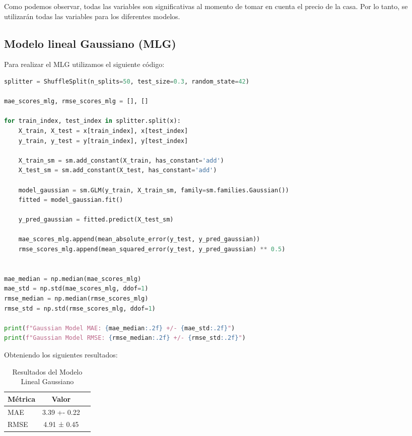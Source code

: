 \documentclass[12pt,a4paper]{article}
\begin{document}
Como podemos observar, todas las variables son significativas al momento de tomar en cuenta el precio de la casa. Por lo tanto, se utilizarán todas las variables para los diferentes modelos.

\vspace{0.5cm}

\subsection{Modelo lineal Gaussiano (MLG)}

Para realizar el MLG utilizamos el siguiente código:

\begin{lstlisting}[language=Python, frame=single, basicstyle=\ttfamily\small, breaklines=true]
splitter = ShuffleSplit(n_splits=50, test_size=0.3, random_state=42)

mae_scores_mlg, rmse_scores_mlg = [], []

for train_index, test_index in splitter.split(x):
    X_train, X_test = x[train_index], x[test_index]
    y_train, y_test = y[train_index], y[test_index]

    X_train_sm = sm.add_constant(X_train, has_constant='add')
    X_test_sm = sm.add_constant(X_test, has_constant='add')

    model_gaussian = sm.GLM(y_train, X_train_sm, family=sm.families.Gaussian())
    fitted = model_gaussian.fit()

    y_pred_gaussian = fitted.predict(X_test_sm)

    mae_scores_mlg.append(mean_absolute_error(y_test, y_pred_gaussian))
    rmse_scores_mlg.append(mean_squared_error(y_test, y_pred_gaussian) ** 0.5)


mae_median = np.median(mae_scores_mlg)
mae_std = np.std(mae_scores_mlg, ddof=1)
rmse_median = np.median(rmse_scores_mlg)
rmse_std = np.std(rmse_scores_mlg, ddof=1)

print(f"Gaussian Model MAE: {mae_median:.2f} +/- {mae_std:.2f}")
print(f"Gaussian Model RMSE: {rmse_median:.2f} +/- {rmse_std:.2f}")
\end{lstlisting}

Obteniendo los siguientes resultados:

\vspace{0.3cm}

\begin{table}[H]
\centering
\caption{Resultados del Modelo Lineal Gaussiano}\label{tab:regresion_resultados}
\begin{tabular}{lcc}
\toprule
\textbf{Métrica} & \textbf{Valor} \\
\midrule
MAE & 3.39 +- 0.22  \\
RMSE & 4.91 ± 0.45  \\
\bottomrule
\end{tabular}
\end{table}
\end{document}
